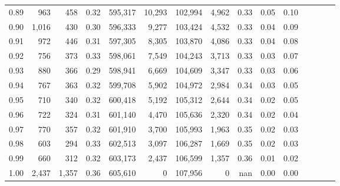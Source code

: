 \begin{tabular}{rrrcrrrrrrrrrrr}
0.89 &     963 &    458 &                                       0.32 &  595,317 &   10,293 &  102,994 &    4,962 &  0.33 &  0.05 &                         0.10 \\
0.90 &   1,016 &    430 &                                       0.30 &  596,333 &    9,277 &  103,424 &    4,532 &  0.33 &  0.04 &                         0.09 \\
0.91 &     972 &    446 &                                       0.31 &  597,305 &    8,305 &  103,870 &    4,086 &  0.33 &  0.04 &                         0.08 \\
0.92 &     756 &    373 &                                       0.33 &  598,061 &    7,549 &  104,243 &    3,713 &  0.33 &  0.03 &                         0.07 \\
0.93 &     880 &    366 &                                       0.29 &  598,941 &    6,669 &  104,609 &    3,347 &  0.33 &  0.03 &                         0.06 \\
0.94 &     767 &    363 &                                       0.32 &  599,708 &    5,902 &  104,972 &    2,984 &  0.34 &  0.03 &                         0.05 \\
0.95 &     710 &    340 &                                       0.32 &  600,418 &    5,192 &  105,312 &    2,644 &  0.34 &  0.02 &                         0.05 \\
0.96 &     722 &    324 &                                       0.31 &  601,140 &    4,470 &  105,636 &    2,320 &  0.34 &  0.02 &                         0.04 \\
0.97 &     770 &    357 &                                       0.32 &  601,910 &    3,700 &  105,993 &    1,963 &  0.35 &  0.02 &                         0.03 \\
0.98 &     603 &    294 &                                       0.33 &  602,513 &    3,097 &  106,287 &    1,669 &  0.35 &  0.02 &                         0.03 \\
0.99 &     660 &    312 &                                       0.32 &  603,173 &    2,437 &  106,599 &    1,357 &  0.36 &  0.01 &                         0.02 \\
1.00 &   2,437 &  1,357 &                                       0.36 &  605,610 &        0 &  107,956 &        0 &   nan &  0.00 &                         0.00 \\
\bottomrule
\end{tabular}
